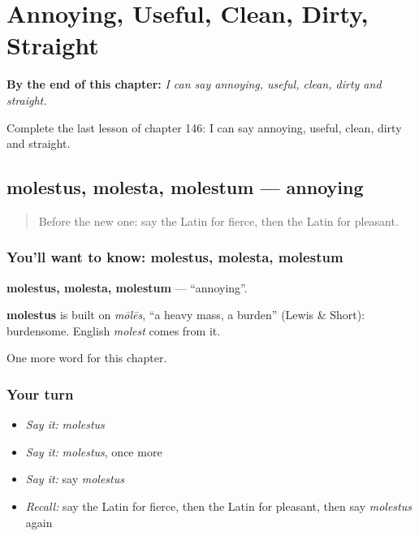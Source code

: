 
\chapter{Annoying, Useful, Clean, Dirty, Straight}
\label{ch:la-annoying-useful-clean-dirty-straight}

\begin{chapteropening}
\textbf{By the end of this chapter:} \emph{I can say annoying, useful, clean, dirty and straight.}

Complete the last lesson of chapter 146: I can say annoying, useful, clean, dirty and straight.
\end{chapteropening}

\section[molestus, molesta, molestum]{molestus, molesta, molestum — annoying}

\label{lesson:LA-C146-molestus}



\begin{quote}
Before the new one: say the Latin for fierce, then the Latin for pleasant.
\end{quote}

\subsection*{You'll want to know: molestus, molesta, molestum}
\textbf{molestus, molesta, molestum} — \textquotedblleft{}annoying\textquotedblright{}.

\begin{cousinweb}
\textbf{molestus} is built on \emph{mōlēs}, \textquotedblleft{}a heavy mass, a burden\textquotedblright{} (Lewis \& Short): burdensome. English \emph{molest} comes from it.
\end{cousinweb}

\begin{grammarlens}[title={What you've built}]
One more word for this chapter.
\end{grammarlens}

\subsection*{Your turn}
\begin{itemize}
\raggedright
  \item \emph{Say it:} \emph{molestus}
  \item \emph{Say it:} \emph{molestus}, once more
  \item \emph{Say it:} say \emph{molestus}
  \item \emph{Recall:} say the Latin for fierce, then the Latin for pleasant, then say \emph{molestus} again
\end{itemize}

